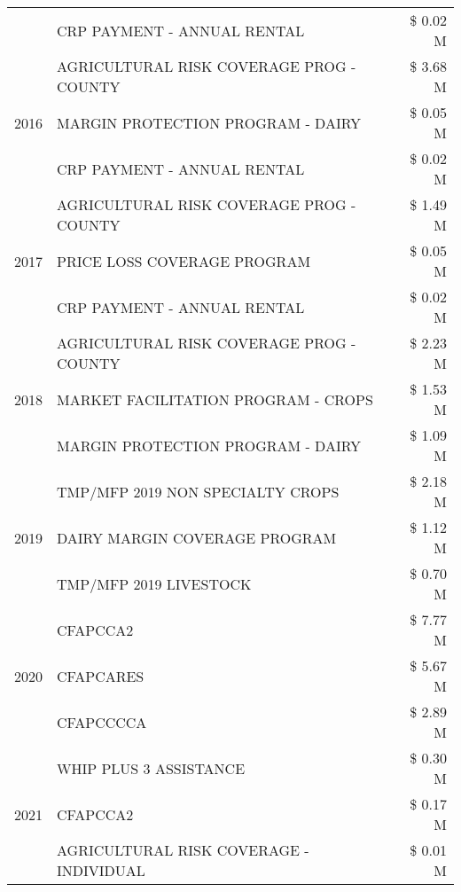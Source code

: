 \begin{tabular}{llr}
 & CRP PAYMENT - ANNUAL RENTAL & \$ 0.02 M \\
\cline{1-3}
\multirow[t]{3}{*}{2016} & AGRICULTURAL RISK COVERAGE PROG - COUNTY & \$ 3.68 M \\
 & MARGIN PROTECTION PROGRAM - DAIRY & \$ 0.05 M \\
 & CRP PAYMENT - ANNUAL RENTAL & \$ 0.02 M \\
\cline{1-3}
\multirow[t]{3}{*}{2017} & AGRICULTURAL RISK COVERAGE PROG - COUNTY & \$ 1.49 M \\
 & PRICE LOSS COVERAGE PROGRAM & \$ 0.05 M \\
 & CRP PAYMENT - ANNUAL RENTAL & \$ 0.02 M \\
\cline{1-3}
\multirow[t]{3}{*}{2018} & AGRICULTURAL RISK COVERAGE PROG - COUNTY & \$ 2.23 M \\
 & MARKET FACILITATION PROGRAM - CROPS & \$ 1.53 M \\
 & MARGIN PROTECTION PROGRAM - DAIRY & \$ 1.09 M \\
\cline{1-3}
\multirow[t]{3}{*}{2019} & TMP/MFP 2019 NON SPECIALTY CROPS & \$ 2.18 M \\
 & DAIRY MARGIN COVERAGE PROGRAM & \$ 1.12 M \\
 & TMP/MFP 2019 LIVESTOCK & \$ 0.70 M \\
\cline{1-3}
\multirow[t]{3}{*}{2020} & CFAPCCA2 & \$ 7.77 M \\
 & CFAPCARES & \$ 5.67 M \\
 & CFAPCCCCA & \$ 2.89 M \\
\cline{1-3}
\multirow[t]{3}{*}{2021} & WHIP PLUS 3 ASSISTANCE & \$ 0.30 M \\
 & CFAPCCA2 & \$ 0.17 M \\
 & AGRICULTURAL RISK COVERAGE - INDIVIDUAL & \$ 0.01 M \\
\cline{1-3}
\bottomrule
\end{tabular}
